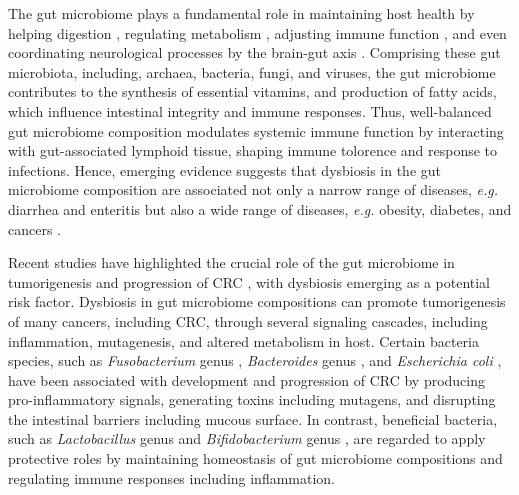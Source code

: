 \documentclass[11pt, a4paper, onecolumn, oneside]{report}
\begin{document}
            The gut microbiome plays a fundamental role in maintaining host health by helping digestion \cite{gut-digestion-1, gut-digestion-2}, regulating metabolism \cite{gut-metabolism-1, gut-metabolism-2, gut-metabolism-3}, adjusting immune function \cite{gut-immune-1, gut-immune-2, gut-immune-3}, and even coordinating neurological processes by the brain-gut axis \cite{brain-gut-1, brain-gut-2, brain-gut-3}. Comprising these gut microbiota, including, archaea, bacteria, fungi, and viruses, the gut microbiome contributes to the synthesis of essential vitamins, and production of fatty acids, which influence intestinal integrity and immune responses. Thus, well-balanced gut microbiome composition modulates systemic immune function by interacting with gut-associated lymphoid tissue, shaping immune tolorence and response to infections. Hence, emerging evidence suggests that dysbiosis in the gut microbiome composition are associated not only a narrow range of diseases, \textit{e.g.} diarrhea and enteritis \cite{gut-diarrhea-1, gut-diarrhea-2} but also a wide range of diseases, \textit{e.g.} obesity, diabetes, and cancers \cite{microbiome-diabetes-1, microbiome-diabetes-2, microbiome-cancer-1, microbiome-cancer-2}.

            Recent studies have highlighted the crucial role of the gut microbiome in tumorigenesis and progression of CRC \cite{gut-CRC-1, gut-CRC-2}, with dysbiosis emerging as a potential risk factor. Dysbiosis in gut microbiome compositions can promote tumorigenesis of many cancers, including CRC, through several signaling cascades, including inflammation, mutagenesis, and altered metabolism in host. Certain bacteria species, such as \textit{Fusobacterium} genus \cite{Fusobacterium-5, Fusobacterium-6, Fusobacterium-7}, \textit{Bacteroides} genus \cite{Bacteroides-1, Bacteroides-2}, and \textit{Escherichia coli} \cite{Escherichia-1, Escherichia-2}, have been associated with development and progression of CRC by producing pro-inflammatory signals, generating toxins including mutagens, and disrupting the intestinal barriers including mucous surface. In contrast, beneficial bacteria, such as \textit{Lactobacillus} genus \cite{Lactobacillus-1, Lactobacillus-2} and \textit{Bifidobacterium} genus \cite{Bifidobacterium-1, Bifidobacterium-2}, are regarded to apply protective roles by maintaining homeostasis of gut microbiome compositions and regulating immune responses including inflammation.
\end{document}
